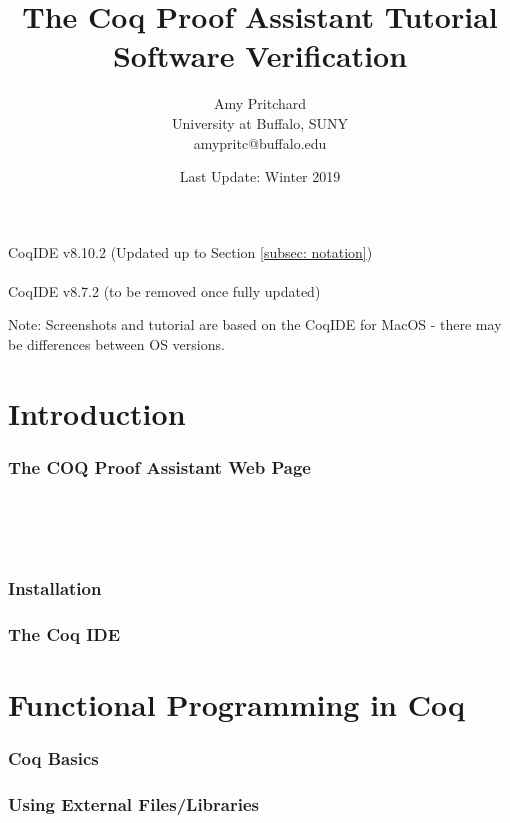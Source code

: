 \documentclass{article}
\title{\textbf{The Coq Proof Assistant Tutorial} 
	\\ Software Verification}
\author{Amy Pritchard 
	\\ University at Buffalo, SUNY
	\\ amypritc@buffalo.edu}
\date{Last Update: Winter 2019}
\begin{document}
\maketitle

\begin{center}
	CoqIDE v8.10.2 (Updated up to Section \ref{subsec: notation})
\\~\\
	CoqIDE v8.7.2 (to be removed once fully updated)
\end{center}

\vfill
\noindent
{\footnotesize Note: Screenshots and tutorial are based on the CoqIDE for MacOS - there may be differences between OS versions. }

\newpage
\tableofcontents


\newpage
\part{Introduction}
	\label{Part: intro}
\section{The COQ Proof Assistant Web Page} 
	\label{Sec: webpage}
	

~\\~\\~\\
\section{Installation} 
	\label{Sec: installation}
	 


\newpage
\section{The Coq IDE} 
	\label{Sec: ide}
	


\newpage
\part{Functional Programming in Coq}
	\label{Part: program}
\section{Coq Basics}
	\label{Sec: basics}
	


\newpage
\section{Using External Files/Libraries}
	\label{Sec: files}
	
\end{document}
